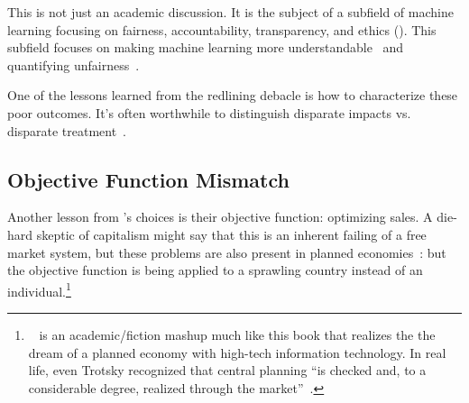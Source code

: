 This is not just an academic discussion.  It is the subject of a
subfield of machine learning focusing on fairness, accountability,
transparency, and ethics ().
%
This subfield focuses on making machine learning more
understandable~\citep{DoshiVelez-17} and quantifying
unfairness~\citep{speicher-18}.

One of the lessons learned from the redlining debacle is how to
characterize these poor outcomes.  It's often worthwhile to
distinguish disparate impacts vs. disparate
treatment~\citep{hillier-03}.


\subsection{Objective Function Mismatch}

Another lesson from \energyCompany{}'s choices is their objective
function: optimizing sales.  A die-hard skeptic of capitalism might
say that this is an inherent failing of a free market system, but these
problems are also present in planned economies~\citep{moroney-97}:
but the objective function is being applied to a sprawling country
instead of an individual.\footnote{~\citep{spufford-10} is an academic/fiction mashup much like
  this book that realizes the the dream of a planned economy with
  high-tech information technology.  In real life, even Trotsky
  recognized that central planning ``is checked and, to a considerable
  degree, realized through the market''~\citep{trotsky-32}.}

